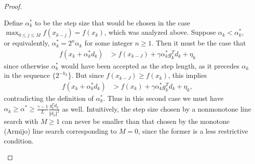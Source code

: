 \documentclass[10pt,a4paper]{amsart}
\begin{document}
\begin{proof}
\begin{enumerate}
Define $\alpha_k^*$ to be the step size that would be chosen in the case  $\displaystyle \max_{0 \leq j \leq M} f(x_{k-j}) = f(x_k)$, which was analyzed above. Suppose $\alpha_k < \alpha_k^*$, or equivalently, $\alpha_k^* = 2^n \alpha_k$ for some integer $n \geq 1$. Then it must be the case that
\begin{align*}
f(x_k + \alpha_k^* d_k) &> f(x_{k-J}) + \gamma \alpha_k^* g_k^T d_k + \eta_k
\end{align*}
since otherwise $\alpha_k^*$ would have been accepted as the step length, as it precedes $\alpha_k$ in the sequence $\{2^{-h_k}$\}. But since $f(x_{k-J}) \geq f(x_k)$, this implies
\begin{align*}
f(x_k + \alpha_k^* d_k) &> f(x_{k}) + \gamma \alpha_k^* g_k^T d_k + \eta_k,
\end{align*}
contradicting the definition of $\alpha_k^*$. Thus in this second case we must have $\displaystyle \alpha_k \geq \alpha^* \geq \frac{\gamma-1}{L} \frac{g_k^T d_k}{\Vert d_k \Vert^2}$ as well. Intuitively, the step size chosen by a nonmonotone line search with $M \geq 1$ can never be smaller than that chosen by the monotone (Armijo) line search corresponding to $M=0$, since the former is a less restrictive condition.
\end{enumerate}
\end{proof}
\end{document}

